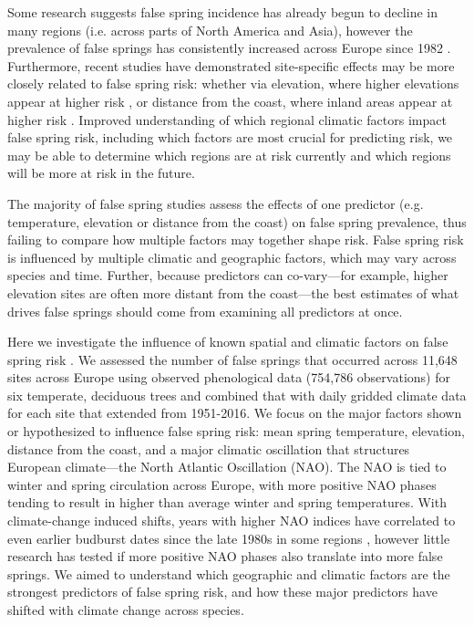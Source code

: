 \documentclass{article}\usepackage[]{graphicx}\usepackage[]{color}
\begin{document}
Some research suggests false spring incidence has already begun to decline in many regions (i.e. across parts of North America and Asia), however the prevalence of false springs has consistently increased across Europe since 1982 \citep{Liu2018}. Furthermore, recent studies have demonstrated site-specific effects may be more closely related to false spring risk: whether via elevation, where higher elevations appear at higher risk \citep{Ma2018, Vitasse2018, Vitra2017}, or distance from the coast, where inland areas appear at higher risk \citep{ Ma2018, Wypych2016a}. Improved understanding of which regional climatic factors impact false spring risk, including which factors are most crucial for predicting risk, we may be able to determine which regions are at risk currently and which regions will be more at risk in the future.

The majority of false spring studies assess the effects of one predictor (e.g. temperature, elevation or distance from the coast) on false spring prevalence, thus failing to compare how multiple factors may together shape risk. False spring risk is influenced by multiple climatic and geographic factors, which may vary across species and time. Further, because predictors can co-vary---for example, higher elevation sites are often more distant from the coast---the best estimates of what drives false springs should come from examining all predictors at once. 

Here we investigate the influence of known spatial and climatic factors on false spring risk \citep[defined here as when fell temperatures below -2.2$^{\circ}$ between estimated budburst and leafout][]{Schwartz1993}. We assessed the number of false springs that occurred across 11,648 sites across Europe using observed phenological data (754,786 observations) for six temperate, deciduous trees and combined that with daily gridded climate data for each site that extended from 1951-2016. We focus on the major factors shown or hypothesized to influence false spring risk: mean spring temperature, elevation, distance from the coast, and a major climatic oscillation that structures European climate---the North Atlantic Oscillation (NAO). The NAO  is tied to winter and spring circulation across Europe, with more positive NAO phases tending to result in higher than average winter and spring temperatures. With climate-change induced shifts, years with higher NAO indices have correlated to even earlier budburst dates since the late 1980s in some regions \citep{Chmielewski2001}, however little research has tested if more positive NAO phases also translate into more false springs. We aimed to understand which geographic and climatic factors are the strongest predictors of false spring risk, and how these major predictors have shifted with climate change across species. 
\end{document}
